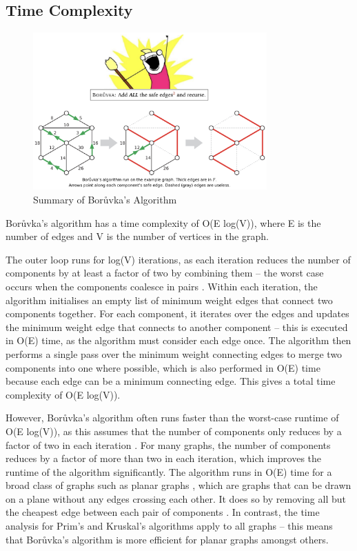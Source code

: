 \documentclass[a4paper, 11pt]{article}
\begin{document}
\subsection{Time Complexity}
\begin{figure}[h]
    \caption{Summary of Borůvka's Algorithm \cite{erickson2014MSTs}}
    \begin{center}
        \includegraphics[width=0.8\textwidth]{Summary of Boruvka's Algorithm.png}
    \end{center}
\end{figure}

Borůvka's algorithm has a time complexity of O(E log(V)), where E is the number of edges and V is the number of vertices in the graph.

The outer loop runs for log(V) iterations, as each iteration reduces the number of components by at least a factor of two by combining them -- the worst case occurs when the components coalesce in pairs \cite{erickson2014MSTs}. Within each iteration, the algorithm initialises an empty list of minimum weight edges that connect two components together. For each component, it iterates over the edges and updates the minimum weight edge that connects to another component -- this is executed in O(E) time, as the algorithm must consider each edge once. The algorithm then performs a single pass over the minimum weight connecting edges to merge two components into one where possible, which is also performed in O(E) time because each edge can be a minimum connecting edge. This gives a total time complexity of O(E log(V)).

However, Borůvka's algorithm often runs faster than the worst-case runtime of O(E log(V)), as this assumes that the number of components only reduces by a factor of two in each iteration \cite{erickson2014MSTs}. For many graphs, the number of components reduces by a factor of more than two in each iteration, which improves the runtime of the algorithm significantly. The algorithm runs in O(E) time for a broad class of graphs such as planar graphs \cite{cheriton1976finding}, which are graphs that can be drawn on a plane without any edges crossing each other. It does so by removing all but the cheapest edge between each pair of components \cite{marevs2002two}. In contrast, the time analysis for Prim's and Kruskal's algorithms apply to all graphs -- this means that Borůvka's algorithm is more efficient for planar graphs amongst others.
\end{document}
